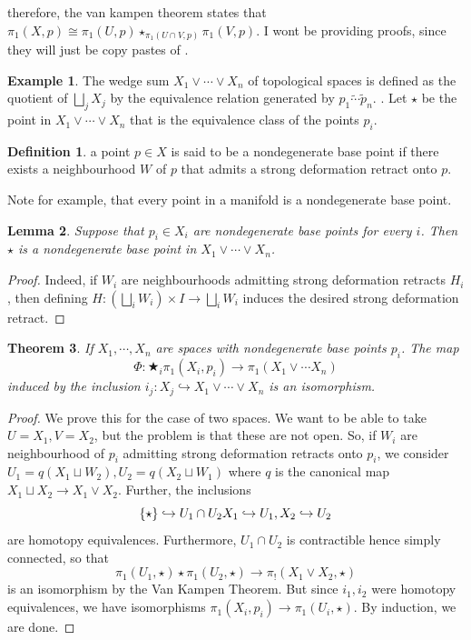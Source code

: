 \documentclass[10pt, openany]{book}
\theoremstyle{plain}
\newtheorem{theorem}{Theorem}[section]
\newtheorem{lemma}[theorem]{Lemma}
\theoremstyle{definition}
\newtheorem{definition}[theorem]{Definition}
\newtheorem{example}{Example}
\theoremstyle{remark}
\begin{document}
therefore, the van kampen theorem states that $\pi_1(X,p)\cong \pi_1(U,p)\star_{\pi_1(U\cap V, p)}\pi_1(V,p)$. I wont be providing proofs, since they will just be copy pastes of \cite{Lee12} .
\begin{example}
    The wedge sum $X_1\vee\cdots\vee X_n$ of topological spaces is defined as the quotient of $\bigsqcup_{j}X_j$ by the equivalence relation generated by $p_1\tilde\cdots\tilde p_n$. . Let $\star$ be the point in  $X_1\vee\cdots\vee X_n$ that is the equivalence class of the points $p_i$.
    \begin{definition}
    a point $p\in X$ is said to be a nondegenerate base point if there exists a neighbourhood $W$ of $p$ that admits a strong deformation retract onto $p$.
\end{definition}
Note for example, that every point in a manifold is a nondegenerate base point.
    \begin{lemma}
    Suppose that $p_i\in X_i$ are nondegenerate base points for every $i$. Then $\star$ is a nondegenerate base point in $X_1\vee\cdots\vee X_n$.
\end{lemma}
\begin{proof}
    Indeed, if $W_i$ are neighbourhoods admitting strong deformation retracts $H_i$, then defining $H : \left(\bigsqcup_i W_i\right)\times I\rightarrow \bigsqcup_i W_i$ induces the desired strong deformation retract.
\end{proof}
\begin{theorem}
    If $X_1,\cdots ,X_n$ are spaces with nondegenerate base points $p_i$. The map $$\Phi: \bigstar_i\pi_1(X_i,p_i)\rightarrow \pi_1(X_1\vee\cdots X_n)$$ induced by the inclusion $i_j : X_j\hookrightarrow X_1\vee\cdots\vee X_n$ is an isomorphism.
\end{theorem}
\begin{proof}
    We prove this for the case of two spaces. We want to be able to take $U = X_1, V=X_2$, but the problem is that these are not open. So, if $W_i$ are neighbourhood of $p_i$ admitting strong deformation retracts onto $p_i$, we consider $U_1 = q(X_1\sqcup W_2), U_2 = q(X_2\sqcup W_1)$ where $q$ is the canonical map $X_1\sqcup X_2\rightarrow X_1\vee X_2$. Further, the inclusions $$\{\star\}\hookrightarrow U_1\cap U_2\\ X_1\hookrightarrow U_1, \\ X_2\hookrightarrow U_2$$ are homotopy equivalences. Furthermore, $U_1\cap U_2$ is contractible hence simply connected, so that $$\pi_1(U_1,\star)\star\pi_1(U_2,\star)\rightarrow \pi_!(X_1\vee X_2,\star)$$ is an isomorphism by the Van Kampen Theorem. But since $i_1,i_2$ were homotopy equivalences, we have isomorphisms $\pi_1(X_i,p_i)\rightarrow \pi_1(U_i,\star)$. By induction, we are done.
\end{proof}
    \end{example}



\end{document}
